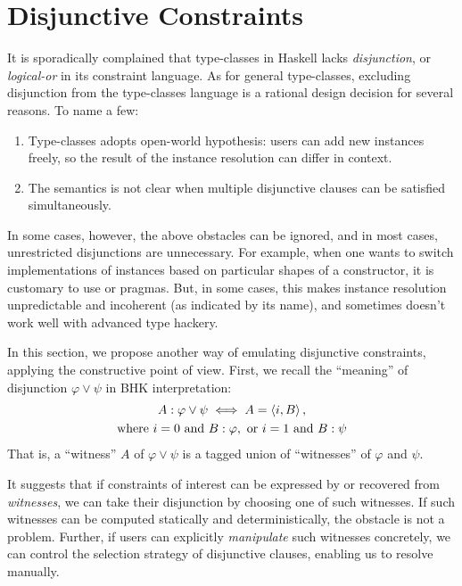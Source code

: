 \documentclass[demotion-paper.tex]{subfiles}
\begin{document}
\section{Disjunctive Constraints}
\label{sec:disj}
It is sporadically complained that type-classes in Haskell lacks \emph{disjunction}, or \emph{logical-or} in its constraint language.
As for general type-classes, excluding disjunction from the type-classes language is a rational design decision for several reasons.
To name a few:
\begin{enumerate}
  \item Type-classes adopts open-world hypothesis: users can add new instances freely, so the result of the instance resolution can differ in context.
  \label{item:openness}
  \item The semantics is not clear when multiple disjunctive clauses can be satisfied simultaneously.
  \label{item:arb-choice}
\end{enumerate}
In some cases, however, the above obstacles can be ignored, and in most cases, unrestricted disjunctions are unnecessary.
For example, when one wants to switch implementations of instances based on particular shapes of a constructor, it is customary to use  or  pragmas.
But, in some cases, this makes instance resolution unpredictable and incoherent (as indicated by its name), and sometimes doesn't work well with advanced type hackery.

In this section, we propose another way of emulating disjunctive constraints, applying the constructive point of view.
First, we recall the ``meaning'' of disjunction $\varphi \vee \psi$ in BHK interpretation:
\begin{gather*}
      A: \varphi \vee \psi \iff A = \braket{i, B},
    \\
    \text{where }
    i = 0 \text{ and } B: \varphi, \text{ or }
    i = 1 \text{ and } B: \psi
\end{gather*}
That is, a ``witness'' $A$ of $\varphi \vee \psi$ is a tagged union of ``witnesses'' of $\varphi$ and $\psi$.

It suggests that if constraints of interest can be expressed by or recovered from \emph{witnesses}, we can take their disjunction by choosing one of such witnesses.
If such witnesses can be computed statically and deterministically, the obstacle  is not a problem.
Further, if users can explicitly \emph{manipulate} such witnesses concretely, we can control the selection strategy of disjunctive clauses, enabling us to resolve  manually.
\end{document}
